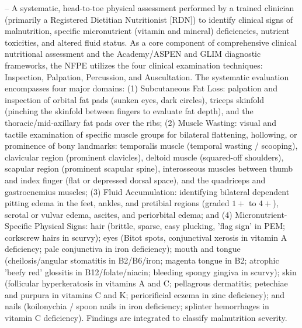 -- A systematic, head-to-toe physical assessment performed by a trained clinician (primarily a Registered Dietitian Nutritionist [RDN]) to identify clinical signs of malnutrition, specific micronutrient (vitamin and mineral) deficiencies, nutrient toxicities, and altered fluid status. As a core component of comprehensive clinical nutritional assessment and the Academy/ASPEN and GLIM diagnostic frameworks, the NFPE utilizes the four clinical examination techniques: Inspection, Palpation, Percussion, and Auscultation. The systematic evaluation encompasses four major domains: (1) Subcutaneous Fat Loss: palpation and inspection of orbital fat pads (sunken eyes, dark circles), triceps skinfold (pinching the skinfold between fingers to evaluate fat depth), and the thoracic/mid-axillary fat pads over the ribs; (2) Muscle Wasting: visual and tactile examination of specific muscle groups for bilateral flattening, hollowing, or prominence of bony landmarks: temporalis muscle (temporal wasting / scooping), clavicular region (prominent clavicles), deltoid muscle (squared-off shoulders), scapular region (prominent scapular spine), interosseous muscles between thumb and index finger (flat or depressed dorsal space), and the quadriceps and gastrocnemius muscles; (3) Fluid Accumulation: identifying bilateral dependent pitting edema in the feet, ankles, and pretibial regions (graded $1+$ to $4+$), scrotal or vulvar edema, ascites, and periorbital edema; and (4) Micronutrient-Specific Physical Signs: hair (brittle, sparse, easy plucking, 'flag sign' in PEM; corkscrew hairs in scurvy); eyes (Bitot spots, conjunctival xerosis in vitamin A deficiency; pale conjunctiva in iron deficiency); mouth and tongue (cheilosis/angular stomatitis in B2/B6/iron; magenta tongue in B2; atrophic 'beefy red' glossitis in B12/folate/niacin; bleeding spongy gingiva in scurvy); skin (follicular hyperkeratosis in vitamins A and C; pellagrous dermatitis; petechiae and purpura in vitamins C and K; periorificial eczema in zinc deficiency); and nails (koilonychia / spoon nails in iron deficiency; splinter hemorrhages in vitamin C deficiency). Findings are integrated to classify malnutrition severity.

